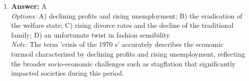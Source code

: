 \documentclass[12pt]{article}
\begin{document}
\begin{enumerate}[label=\arabic*.]
\\ \textit{Note:} The correct answer is supported by Durkheim's emphasis on collective representations as the shared beliefs and values that provide social cohesion and identity within a society, often embodied in symbols or figures that unite individuals under common moral frameworks.
\item \textbf{Answer:} A
\\ \textit{Options:} A) declining profits and rising unemployment; B) the eradication of the welfare state; C) rising divorce rates and the decline of the traditional family; D) an unfortunate twist in fashion sensibility
\\ \textit{Note:} The term 'crisis of the 1970 s' accurately describes the economic turmoil characterized by declining profits and rising unemployment, reflecting the broader socio-economic challenges such as stagflation that significantly impacted societies during this period.
\end{enumerate}
\end{document}
